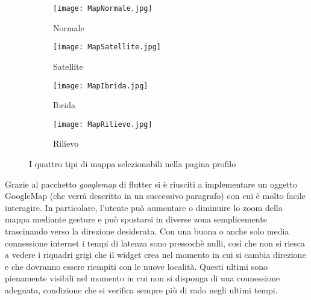 \begin{figure}[h!]
    \centering
    \begin{subfigure}{0.33\linewidth}
        \texttt{[image: MapNormale.jpg]}
        \caption{Normale}
    \end{subfigure}
    \begin{subfigure}{0.33\linewidth}
        \texttt{[image: MapSatellite.jpg]}
        \caption{Satellite}
    \end{subfigure}
    \begin{subfigure}{0.33\linewidth}
        \texttt{[image: MapIbrida.jpg]}
        \caption{Ibrida}
    \end{subfigure}
    \begin{subfigure}{0.33\linewidth}
        \texttt{[image: MapRilievo.jpg]}
        \caption{Rilievo}
    \end{subfigure}
    \caption{I quattro tipi di mappa selezionabili nella pagina profilo}
    \label{TipoMappa}
\end{figure} 

Grazie al pacchetto \textit{googlemap} di flutter si è riusciti a implementare un oggetto
GoogleMap (che verrà descritto in un successivo paragrafo) con cui è molto
facile interagire. In particolare, l'utente può aumentare o diminuire lo zoom
della mappa mediante gesture e
può spostarsi in diverse zona semplicemente trascinando verso la direzione
desiderata. Con una buona o anche solo media connessione internet i tempi di
latenza sono pressochè nulli, così che non si riesca a vedere i riquadri grigi
che il widget crea nel momento in cui si cambia direzione e che dovranno essere
riempiti con le nuove località. Questi ultimi sono pienamente visibili nel
momento in cui non si disponga di una connessione adeguata, condizione che si
verifica sempre più di rado negli ultimi tempi. 



